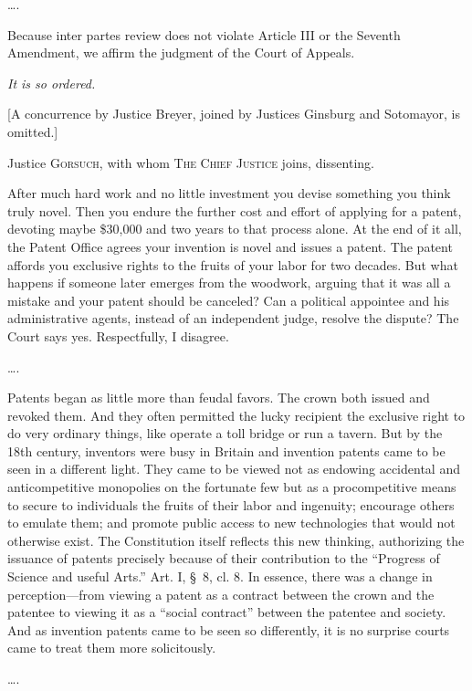 \ldots.



Because inter partes review does not violate Article III or the Seventh
Amendment, we affirm the judgment of the Court of Appeals.

\textit{It is so ordered.}

[A concurrence by Justice Breyer, joined by Justices Ginsburg and Sotomayor, is
omitted.]

\opinion Justice \textsc{Gorsuch}, with whom \textsc{The Chief Justice} joins,
dissenting.

After much hard work and no little investment you devise something you think
truly novel. Then you endure the further cost and effort of applying for a
patent, devoting maybe \$30,000 and two years to that process alone. At the end
of it all, the Patent Office agrees your invention is novel and issues a patent.
The patent affords you exclusive rights to the fruits of your labor for two
decades. But what happens if someone later emerges from the woodwork, arguing
that it was all a mistake and your patent should be canceled? Can a political
appointee and his administrative agents, instead of an independent judge,
resolve the dispute? The Court says yes. Respectfully, I disagree.


\ldots.


Patents began as little
more than feudal favors. The crown both issued and
revoked them. And they often permitted the lucky
recipient the exclusive right to do very ordinary things, like operate a toll
bridge or run a tavern. But by the 18th century, inventors were
busy in Britain and invention patents came to be seen in a different light. They
came to be viewed not as endowing accidental and anticompetitive monopolies on
the fortunate few but as a procompetitive means to secure to individuals the
fruits of their labor and ingenuity; encourage others to emulate them; and
promote public access to new technologies that would not otherwise exist.
The Constitution itself reflects this new
thinking, authorizing the issuance of patents precisely because of their
contribution to the ``Progress of Science and useful Arts.'' Art. I, \S~8, cl.
8. In essence, there was a change in perception---from viewing a patent as a
contract between the crown and the patentee to viewing it as a ``social
contract'' between the patentee and society.
And as invention patents came to be seen so differently, it is no
surprise courts came to treat them more solicitously.


\ldots.

